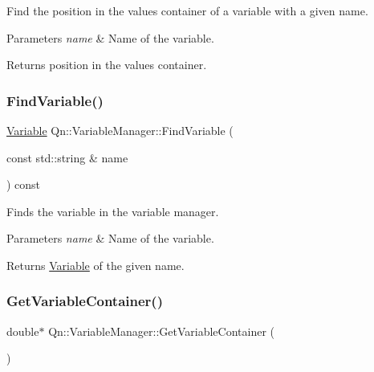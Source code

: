 Find the position in the values container of a variable with a given name. 


\begin{DoxyParams}{Parameters}
{\em name} & Name of the variable. \\
\hline
\end{DoxyParams}
\begin{DoxyReturn}{Returns}
position in the values container. 
\end{DoxyReturn}
\mbox{\label{classQn_1_1VariableManager_a7fa013595b7bad28ff827565095b0e53}} 
\subsubsection{\texorpdfstring{Find\+Variable()}{FindVariable()}}
{\footnotesize\ttfamily \mbox{\hyperlink{classQn_1_1Variable}{Variable}} Qn\+::\+Variable\+Manager\+::\+Find\+Variable (\begin{DoxyParamCaption}\item[{const std\+::string \&}]{name }\end{DoxyParamCaption}) const\hspace{0.3cm}{\ttfamily [inline]}}



Finds the variable in the variable manager. 


\begin{DoxyParams}{Parameters}
{\em name} & Name of the variable. \\
\hline
\end{DoxyParams}
\begin{DoxyReturn}{Returns}
\mbox{\hyperlink{classQn_1_1Variable}{Variable}} of the given name. 
\end{DoxyReturn}
\mbox{\label{classQn_1_1VariableManager_a92e8ecd78b48bf6a719f3cacb11d1d8c}} 
\subsubsection{\texorpdfstring{Get\+Variable\+Container()}{GetVariableContainer()}}
{\footnotesize\ttfamily double$\ast$ Qn\+::\+Variable\+Manager\+::\+Get\+Variable\+Container (\begin{DoxyParamCaption}{ }\end{DoxyParamCaption})\hspace{0.3cm}{\ttfamily [inline]}}



